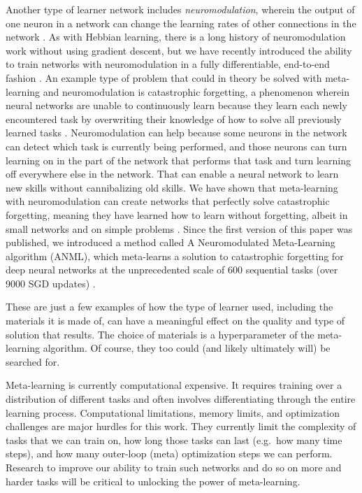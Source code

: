 \documentclass{article}
\begin{document}
Another type of learner network includes \emph{neuromodulation}, wherein the output of one neuron in a network can change the learning rates of other connections in the network \cite{ellefsen2015neural, velez2017diffusion,norouzzadeh2016neuromodulation,soltoggio2018born,risi2009novelty,soltoggio2012modulated}. As with Hebbian learning, there is a long history of neuromodulation work without using gradient descent, but we have recently introduced the ability to train networks with neuromodulation in a fully differentiable, end-to-end fashion \cite{miconi2018backpropamine}. An example type of problem that could in theory be solved with meta-learning and neuromodulation is catastrophic forgetting, a phenomenon wherein neural networks are unable to continuously learn because they learn each newly encountered task by overwriting their knowledge of how to solve all previously learned tasks \cite{french1992semi,mermillod2013stability,french1999catastrophic}. Neuromodulation can help because some neurons in the network can detect which task is currently being performed, and those neurons can turn learning on in the part of the network that performs that task and turn learning off everywhere else in the network. That can enable a neural network to learn new skills without cannibalizing old skills. 
We have shown that meta-learning with neuromodulation can create networks that perfectly solve catastrophic forgetting, meaning they have learned how to learn without forgetting, albeit in small networks and on simple problems \cite{ellefsen2015neural, velez2017diffusion}. Since the first version of this paper was published, we introduced a method called A Neuromodulated Meta-Learning algorithm (ANML), which meta-learns a solution to catastrophic forgetting for deep neural networks at the unprecedented scale of 600 sequential tasks (over 9000 SGD updates) \cite{beaulieu2020ANML}. 

These are just a few examples of how the type of learner used, including the materials it is made of, can have a meaningful effect on the quality and type of solution that results. The choice of materials is a hyperparameter of the meta-learning algorithm. Of course, they too could (and likely ultimately will) be searched for. 

Meta-learning is currently computational expensive. It requires training over a distribution of different tasks and often involves differentiating through the entire learning process. Computational limitations, memory limits, and optimization challenges are major hurdles for this work. They currently limit the complexity of tasks that we can train on, how long those tasks can last (e.g.\ how many time steps), and how many outer-loop (meta) optimization steps we can perform. Research to improve our ability to train such networks and do so on more and harder tasks will be critical to unlocking the power of meta-learning. 
\end{document}
